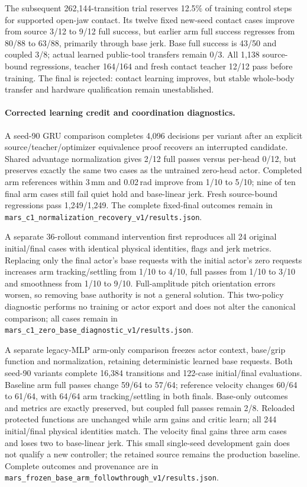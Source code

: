 The subsequent 262,144-transition trial reserves 12.5\% of training control
steps for supported open-jaw contact. Its twelve fixed new-seed contact cases
improve from source 3/12 to 9/12 full success, but earlier arm full success
regresses from 80/88 to 63/88, primarily through base jerk. Base full success
is 43/50 and coupled 3/8; actual learned public-tool transfers remain 0/3.
All 1,138 source-bound regressions, teacher 164/164 and fresh contact teacher
12/12 pass before training. The final is rejected: contact learning improves,
but stable whole-body transfer and hardware qualification remain unestablished.

\paragraph{Corrected learning credit and coordination diagnostics.}
A seed-90 GRU comparison completes 4,096 decisions per variant after an explicit
source/teacher/optimizer equivalence proof recovers an interrupted candidate.
Shared advantage normalization gives 2/12 full passes versus per-head 0/12,
but preserves exactly the same two cases as the untrained zero-head actor.
Completed arm references within 3\,mm and 0.02\,rad improve from 1/10 to 5/10;
nine of ten final arm cases still fail quiet hold and base-linear jerk. Fresh
source-bound regressions pass 1,249/1,249. The complete fixed-final outcomes
remain in \texttt{mars\_c1\_normalization\_recovery\_v1/results.json}.

A separate 36-rollout command intervention first reproduces all 24 original
initial/final cases with identical physical identities, flags and jerk metrics.
Replacing only the final actor's base requests with the initial actor's zero
requests increases arm tracking/settling from 1/10 to 4/10, full passes from
1/10 to 3/10 and smoothness from 1/10 to 9/10. Full-amplitude pitch orientation
errors worsen, so removing base authority is not a general solution. This
two-policy diagnostic performs no training or actor export and does not alter
the canonical comparison; all cases remain in
\texttt{mars\_c1\_zero\_base\_diagnostic\_v1/results.json}.

A separate legacy-MLP arm-only comparison freezes actor context, base/grip
function and normalization, retaining deterministic learned base requests.
Both seed-90 variants complete 16,384 transitions and 122-case initial/final
evaluations. Baseline arm full passes change 59/64 to 57/64; reference velocity
changes 60/64 to 61/64, with 64/64 arm tracking/settling in both finals.
Base-only outcomes and metrics are exactly preserved, but coupled full passes
remain 2/8. Reloaded protected functions are unchanged while arm gains and
critic learn; all 244 initial/final physical identities match. The velocity
final gains three arm cases and loses two to base-linear jerk. This small
single-seed development gain does not qualify a new controller; the retained
source remains the production baseline. Complete outcomes and provenance are
in \texttt{mars\_frozen\_base\_arm\_followthrough\_v1/results.json}.

